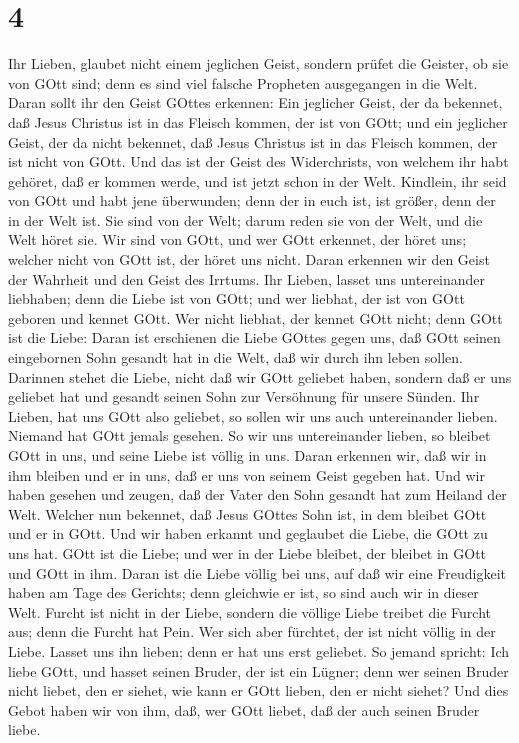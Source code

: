 \hypertarget{section-3}{%
\section{4}\label{section-3}}

 Ihr Lieben, glaubet nicht einem jeglichen Geist, sondern
prüfet die Geister, ob sie von GOtt sind; denn es sind viel falsche
Propheten ausgegangen in die Welt.  Daran sollt ihr den
Geist GOttes erkennen: Ein jeglicher Geist, der da bekennet, daß Jesus
Christus ist in das Fleisch kommen, der ist von GOtt;  und
ein jeglicher Geist, der da nicht bekennet, daß Jesus Christus ist in
das Fleisch kommen, der ist nicht von GOtt. Und das ist der Geist des
Widerchrists, von welchem ihr habt gehöret, daß er kommen werde, und ist
jetzt schon in der Welt.  Kindlein, ihr seid von GOtt und
habt jene überwunden; denn der in euch ist, ist größer, denn der in der
Welt ist.  Sie sind von der Welt; darum reden sie von der
Welt, und die Welt höret sie.  Wir sind von GOtt, und wer
GOtt erkennet, der höret uns; welcher nicht von GOtt ist, der höret uns
nicht. Daran erkennen wir den Geist der Wahrheit und den Geist des
Irrtums.  Ihr Lieben, lasset uns untereinander liebhaben;
denn die Liebe ist von GOtt; und wer liebhat, der ist von GOtt geboren
und kennet GOtt.  Wer nicht liebhat, der kennet GOtt nicht;
denn GOtt ist die Liebe:  Daran ist erschienen die Liebe
GOttes gegen uns, daß GOtt seinen eingebornen Sohn gesandt hat in die
Welt, daß wir durch ihn leben sollen.  Darinnen stehet die
Liebe, nicht daß wir GOtt geliebet haben, sondern daß er uns geliebet
hat und gesandt seinen Sohn zur Versöhnung für unsere Sünden.
 Ihr Lieben, hat uns GOtt also geliebet, so sollen wir uns
auch untereinander lieben.  Niemand hat GOtt jemals
gesehen. So wir uns untereinander lieben, so bleibet GOtt in uns, und
seine Liebe ist völlig in uns.  Daran erkennen wir, daß wir
in ihm bleiben und er in uns, daß er uns von seinem Geist gegeben hat.
 Und wir haben gesehen und zeugen, daß der Vater den Sohn
gesandt hat zum Heiland der Welt.  Welcher nun bekennet,
daß Jesus GOttes Sohn ist, in dem bleibet GOtt und er in GOtt.
 Und wir haben erkannt und geglaubet die Liebe, die GOtt zu
uns hat. GOtt ist die Liebe; und wer in der Liebe bleibet, der bleibet
in GOtt und GOtt in ihm.  Daran ist die Liebe völlig bei
uns, auf daß wir eine Freudigkeit haben am Tage des Gerichts; denn
gleichwie er ist, so sind auch wir in dieser Welt.  Furcht
ist nicht in der Liebe, sondern die völlige Liebe treibet die Furcht
aus; denn die Furcht hat Pein. Wer sich aber fürchtet, der ist nicht
völlig in der Liebe.  Lasset uns ihn lieben; denn er hat
uns erst geliebet.  So jemand spricht: Ich liebe GOtt, und
hasset seinen Bruder, der ist ein Lügner; denn wer seinen Bruder nicht
liebet, den er siehet, wie kann er GOtt lieben, den er nicht siehet?
 Und dies Gebot haben wir von ihm, daß, wer GOtt liebet,
daß der auch seinen Bruder liebe.

